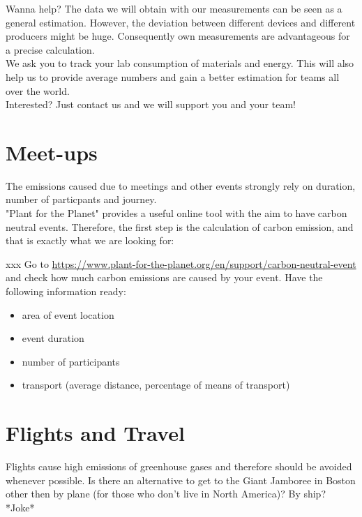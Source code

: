 \begin{suggest}{Wanna help?}
	The data we will obtain with our measurements can be seen as a general estimation.
	However, the deviation between different devices and different producers might be huge. Consequently own measurements are advantageous for a precise calculation.\\
	We ask you to track your lab consumption of materials and energy. This will also help us to provide average numbers and gain a better estimation for teams all over the world. \\
	Interested? Just contact us and we will support you and your team!
	
\end{suggest}

\section{Meet-ups}

The emissions caused due to meetings and other events strongly rely on duration, number of particpants and journey. \\
"Plant for the Planet" provides a useful online tool with the aim to have carbon neutral events. Therefore, the first step is the calculation of carbon emission, and that is exactly what we are looking for:

\begin{suggest} {xxx}%
	Go to \url{https://www.plant-for-the-planet.org/en/support/carbon-neutral-event} and check how much carbon emissions are caused by your event. Have the following information ready:
	\begin{itemize}
		\item area of event location
		\item event duration
		\item number of participants
		\item transport (average distance, percentage of means of transport)
	\end{itemize}
\end{suggest}


\section{Flights and Travel}
Flights cause high emissions of greenhouse gases and therefore should be avoided whenever possible. Is there an alternative to get to the Giant Jamboree in Boston other then by plane (for those who don't live in North America)? By ship? *Joke* 



